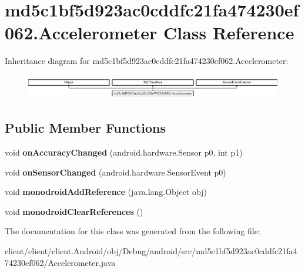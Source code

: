 \hypertarget{classmd5c1bf5d923ac0cddfc21fa474230ef062_1_1Accelerometer}{}\section{md5c1bf5d923ac0cddfc21fa474230ef062.\+Accelerometer Class Reference}
\label{classmd5c1bf5d923ac0cddfc21fa474230ef062_1_1Accelerometer}
Inheritance diagram for md5c1bf5d923ac0cddfc21fa474230ef062.\+Accelerometer\+:\begin{figure}[H]
\begin{center}
\leavevmode
\includegraphics[height=1.091618cm]{classmd5c1bf5d923ac0cddfc21fa474230ef062_1_1Accelerometer}
\end{center}
\end{figure}
\subsection*{Public Member Functions}
\begin{DoxyCompactItemize}
\item 
\hypertarget{classmd5c1bf5d923ac0cddfc21fa474230ef062_1_1Accelerometer_abb893debecd2a27d929f53d6ff593474}{}void {\bfseries on\+Accuracy\+Changed} (android.\+hardware.\+Sensor p0, int p1)\label{classmd5c1bf5d923ac0cddfc21fa474230ef062_1_1Accelerometer_abb893debecd2a27d929f53d6ff593474}

\item 
\hypertarget{classmd5c1bf5d923ac0cddfc21fa474230ef062_1_1Accelerometer_ae5d2c6d93c3a5e135d5fb42aa7acbb36}{}void {\bfseries on\+Sensor\+Changed} (android.\+hardware.\+Sensor\+Event p0)\label{classmd5c1bf5d923ac0cddfc21fa474230ef062_1_1Accelerometer_ae5d2c6d93c3a5e135d5fb42aa7acbb36}

\item 
\hypertarget{classmd5c1bf5d923ac0cddfc21fa474230ef062_1_1Accelerometer_a670aacdbd9cd23dd0b66639c2c721eca}{}void {\bfseries monodroid\+Add\+Reference} (java.\+lang.\+Object obj)\label{classmd5c1bf5d923ac0cddfc21fa474230ef062_1_1Accelerometer_a670aacdbd9cd23dd0b66639c2c721eca}

\item 
\hypertarget{classmd5c1bf5d923ac0cddfc21fa474230ef062_1_1Accelerometer_a833ba03eb2a228ec181250b3b17bc5a7}{}void {\bfseries monodroid\+Clear\+References} ()\label{classmd5c1bf5d923ac0cddfc21fa474230ef062_1_1Accelerometer_a833ba03eb2a228ec181250b3b17bc5a7}

\end{DoxyCompactItemize}


The documentation for this class was generated from the following file\+:\begin{DoxyCompactItemize}
\item 
client/client/client.\+Android/obj/\+Debug/android/src/md5c1bf5d923ac0cddfc21fa474230ef062/Accelerometer.\+java\end{DoxyCompactItemize}
